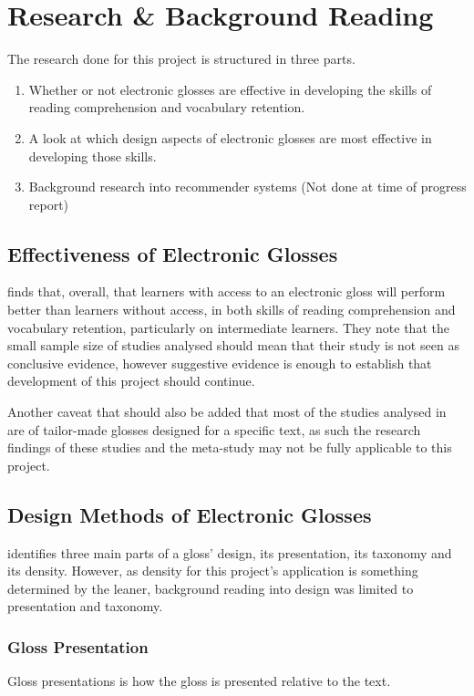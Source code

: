 \chapter{Research \& Background Reading}
The research done for this project is structured in three parts.
\begin{enumerate}
	\item Whether or not electronic glosses are effective in developing the skills of reading comprehension and vocabulary retention.
	\item A look at which design aspects of electronic glosses are most effective in developing those skills.
	\item Background research into recommender systems (Not done at time of progress report) 
\end{enumerate}

\section{Effectiveness of Electronic Glosses}

\textcite{abraham2008} finds that, overall, that learners with access to an electronic gloss will perform better than learners without access, in both skills of reading comprehension and vocabulary retention, particularly on intermediate learners. They note that the small sample size of studies analysed should mean that their study is not seen as conclusive evidence, however suggestive evidence is enough to establish that development of this project should continue.

Another caveat that should also be added that most of the studies analysed in \textcite{abraham2008} are of tailor-made glosses designed for a specific text, as such the research findings of these studies and the meta-study may not be fully applicable to this project.


\section{Design Methods of Electronic Glosses}

 \textcite{roby1999} identifies three main parts of a gloss' design, its presentation, its taxonomy and its density. However, as density for this project's application is something determined by the leaner, background reading into design was limited to presentation and taxonomy. 

\subsection{Gloss Presentation}
Gloss presentations is how the gloss is presented relative to the text. 

